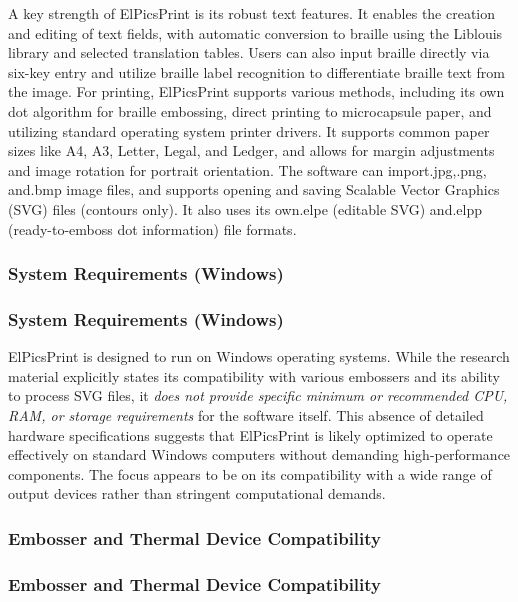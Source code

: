 A key strength of ElPicsPrint is its robust text features. It enables the creation and editing of text fields, with automatic conversion to braille using the Liblouis library and selected translation tables. \cite{TactileViewIrie} Users can also input braille directly via six-key entry and utilize braille label recognition to differentiate braille text from the image. \cite{TactileViewIrie} For printing, ElPicsPrint supports various methods, including its own dot algorithm for braille embossing, direct printing to microcapsule paper, and utilizing standard operating system printer drivers. \cite{TactileViewIrie} It supports common paper sizes like A4, A3, Letter, Legal, and Ledger, and allows for margin adjustments and image rotation for portrait orientation. \cite{TactileViewIrie} The software can import.jpg,.png, and.bmp image files, and supports opening and saving Scalable Vector Graphics (SVG) files (contours only). \cite{TactileViewIrie} It also uses its own.elpe (editable SVG) and.elpp (ready-to-emboss dot information) file formats. \cite{DuxburyDetails}

\subsubsection{System Requirements (Windows)}

\subsubsection{System Requirements (Windows)}

ElPicsPrint is designed to run on Windows operating systems. While the research material explicitly states its compatibility with various embossers and its ability to process SVG files, it \emph{does not provide specific minimum or recommended CPU, RAM, or storage requirements} for the software itself. \cite{TactileViewIrie,DuxburyDetails} This absence of detailed hardware specifications suggests that ElPicsPrint is likely optimized to operate effectively on standard Windows computers without demanding high-performance components. The focus appears to be on its compatibility with a wide range of output devices rather than stringent computational demands.

\subsubsection{Embosser and Thermal Device Compatibility}

\subsubsection{Embosser and Thermal Device Compatibility}

